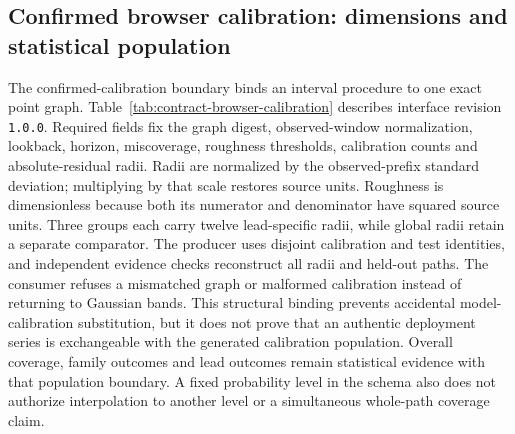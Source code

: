 \subsection{Confirmed browser calibration: dimensions and statistical population}
\label{sec:contract-browser-calibration}
The confirmed-calibration boundary binds an interval procedure to one exact point graph. Table~\ref{tab:contract-browser-calibration} describes interface revision \texttt{1.0.0}. Required fields fix the graph digest, observed-window normalization, lookback, horizon, miscoverage, roughness thresholds, calibration counts and absolute-residual radii. Radii are normalized by the observed-prefix standard deviation; multiplying by that scale restores source units. Roughness is dimensionless because both its numerator and denominator have squared source units. Three groups each carry twelve lead-specific radii, while global radii retain a separate comparator. The producer uses disjoint calibration and test identities, and independent evidence checks reconstruct all radii and held-out paths. The consumer refuses a mismatched graph or malformed calibration instead of returning to Gaussian bands. This structural binding prevents accidental model-calibration substitution, but it does not prove that an authentic deployment series is exchangeable with the generated calibration population. Overall coverage, family outcomes and lead outcomes remain statistical evidence with that population boundary. A fixed probability level in the schema also does not authorize interpolation to another level or a simultaneous whole-path coverage claim.


